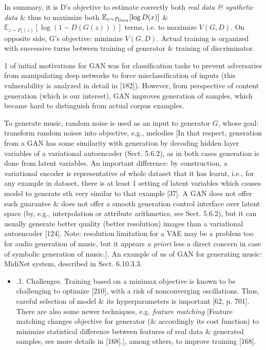 \documentclass{article}
\begin{document}
\begin{itemize}
\begin{itemize}
		In summary, it is D's objective to estimate correctly both {\it real data \& synthetic data} \& thus to maximize both $\mathbb{E}_{x\sim P_{\rm Data}}[\log D(x)]$ \& $\mathbb{E}_{z\sim P_z(z)}[\log(1 - D(G(z)))]$ terms, i.e. to maximize $V(G,D)$. On opposite side, G's objective: minimize $V(G,D)$. Actual training is organized with successive turns between training of generator \& training of discriminator.

		1 of initial motivations for GAN was for classification tasks to prevent adversaries from manipulating deep networks to force misclassification of inputs (this vulnerability is analyzed in detail in [182]). However, from perspective of content generation (which is our interest), GAN improves generation of samples, which became hard to distinguish from actual corpus examples.

		To generate music, random noise is used as an input to generator $G$, whose goal: transform random noises into objective, e.g., melodies [In that respect, generation from a GAN has some similarity with generation by decoding hidden layer variables of a variational autoencoder (Sect. 5.6.2), as in both cases generation is done from latent variables. An important difference: by construction, a variational encoder is representative of whole dataset that it has learnt, i.e., for any example in dataset, there is at least 1 setting of latent variables which causes model to generate sth very similar to that example [37]. A GAN does not offer such guarantee \& does not offer a smooth generation control interface over latent space (by, e.g., interpolation or attribute arithmetics, see Sect. 5.6.2), but it can usually generate better quality (better resolution) images than a variational autoencoder [124]. Note: resolution limitation for a VAE may be a problem too for audio generation of music, but it appears {\it a priori} less a direct concern in case of symbolic generation of music.]. An example of us of GAN for generating music: MidiNet system, described in Sect. 6.10.3.3.
		\begin{itemize}
			\item {.1. Challenges.} Training based on a minimax objective is known to be challenging to optimize [210], with a risk of nonconverging oscillations. Thus, careful selection of model \& its hyperparameters is important [62, p. 701]. There are also some newer techniques, e.g. {\it feature matching} [Feature matching changes objective for generator (\& accordingly its cost function) to minimize statistical difference between features of real data \& generated samples, see more details in [168].], among others, to improve training [168].


\end{itemize}
\end{itemize}
\end{itemize}
\end{document}
